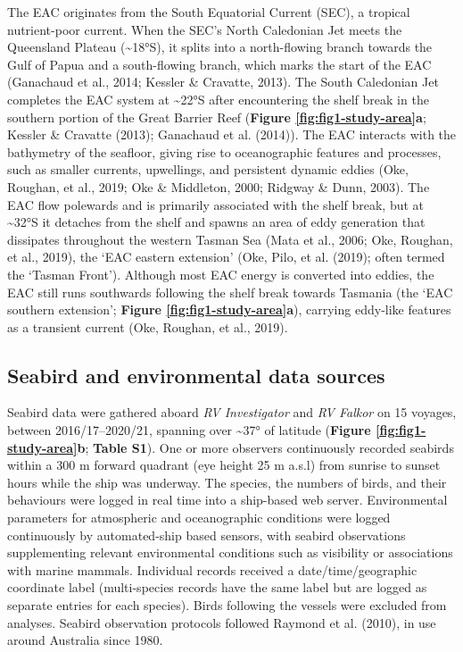 \documentclass{article}
\begin{document}
The EAC originates from the South Equatorial Current (SEC), a tropical nutrient-poor current. When the SEC's North Caledonian Jet meets the Queensland Plateau (\textasciitilde18°S), it splits into a north-flowing branch towards the Gulf of Papua and a south-flowing branch, which marks the start of the EAC (Ganachaud et al., 2014; Kessler \& Cravatte, 2013). The South Caledonian Jet completes the EAC system at \textasciitilde22°S after encountering the shelf break in the southern portion of the Great Barrier Reef (\textbf{Figure \ref{fig:fig1-study-area}a}; Kessler \& Cravatte (2013); Ganachaud et al. (2014)). The EAC interacts with the bathymetry of the seafloor, giving rise to oceanographic features and processes, such as smaller currents, upwellings, and persistent dynamic eddies (Oke, Roughan, et al., 2019; Oke \& Middleton, 2000; Ridgway \& Dunn, 2003). The EAC flow polewards and is primarily associated with the shelf break, but at \textasciitilde32°S it detaches from the shelf and spawns an area of eddy generation that dissipates throughout the western Tasman Sea (Mata et al., 2006; Oke, Roughan, et al., 2019), the `EAC eastern extension' (Oke, Pilo, et al. (2019); often termed the `Tasman Front'). Although most EAC energy is converted into eddies, the EAC still runs southwards following the shelf break towards Tasmania (the `EAC southern extension'; \textbf{Figure \ref{fig:fig1-study-area}a}), carrying eddy-like features as a transient current (Oke, Roughan, et al., 2019).

\hypertarget{seabird-and-environmental-data-sources}{%
\subsection{Seabird and environmental data sources}\label{seabird-and-environmental-data-sources}}

Seabird data were gathered aboard \emph{RV Investigator} and \emph{RV Falkor} on 15 voyages, between 2016/17--2020/21, spanning over \textasciitilde37° of latitude (\textbf{Figure \ref{fig:fig1-study-area}b}; \textbf{Table S1}). One or more observers continuously recorded seabirds within a 300 m forward quadrant (eye height 25 m a.s.l) from sunrise to sunset hours while the ship was underway. The species, the numbers of birds, and their behaviours were logged in real time into a ship-based web server. Environmental parameters for atmospheric and oceanographic conditions were logged continuously by automated-ship based sensors, with seabird observations supplementing relevant environmental conditions such as visibility or associations with marine mammals. Individual records received a date/time/geographic coordinate label (multi-species records have the same label but are logged as separate entries for each species). Birds following the vessels were excluded from analyses. Seabird observation protocols followed Raymond et al. (2010), in use around Australia since 1980.
\end{document}
